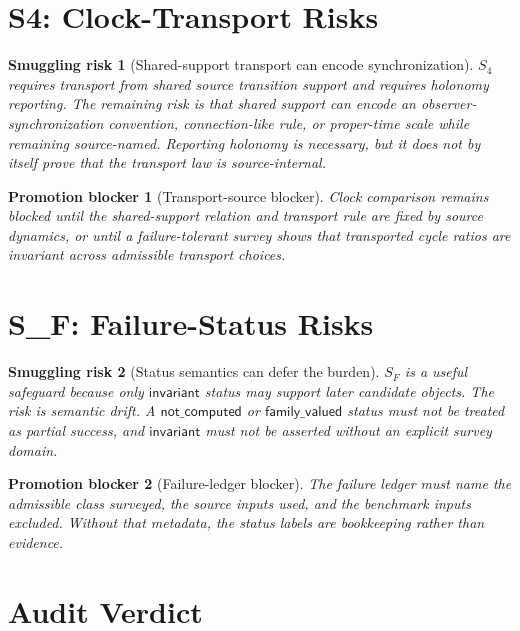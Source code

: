 \documentclass[11pt]{article}
\newtheorem{smugglingrisk}{Smuggling risk}
\newtheorem{promotionblocker}{Promotion blocker}
\begin{document}
\section{S4: Clock-Transport Risks}

\begin{smugglingrisk}[Shared-support transport can encode synchronization]
\(S_4\) requires transport from shared source transition support and requires
holonomy reporting. The remaining risk is that shared support can encode an
observer-synchronization convention, connection-like rule, or proper-time
scale while remaining source-named. Reporting holonomy is necessary, but it
does not by itself prove that the transport law is source-internal.
\end{smugglingrisk}

\begin{promotionblocker}[Transport-source blocker]
Clock comparison remains blocked until the shared-support relation and
transport rule are fixed by source dynamics, or until a failure-tolerant
survey shows that transported cycle ratios are invariant across admissible
transport choices.
\end{promotionblocker}

\section{S_F: Failure-Status Risks}

\begin{smugglingrisk}[Status semantics can defer the burden]
\(S_F\) is a useful safeguard because only \(\mathsf{invariant}\) status may
support later candidate objects. The risk is semantic drift. A
\(\mathsf{not\_computed}\) or \(\mathsf{family\_valued}\) status must not be
treated as partial success, and \(\mathsf{invariant}\) must not be asserted
without an explicit survey domain.
\end{smugglingrisk}

\begin{promotionblocker}[Failure-ledger blocker]
The failure ledger must name the admissible class surveyed, the source inputs
used, and the benchmark inputs excluded. Without that metadata, the status
labels are bookkeeping rather than evidence.
\end{promotionblocker}

\section{Audit Verdict}
\end{document}
